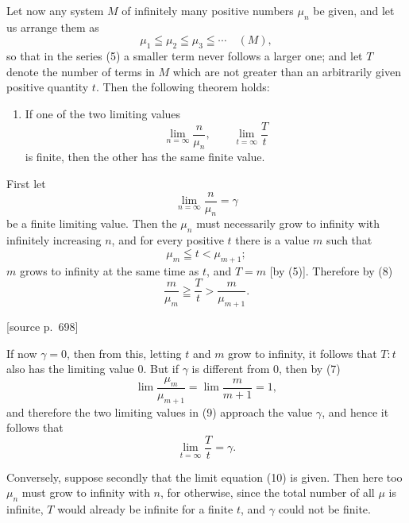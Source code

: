 \documentclass[11pt]{article}
\newcommand{\srcpage}[1]{\par\medskip\noindent\textsf{[source p.~#1]}\par\smallskip}
\begin{document}
Let now any system $M$ of infinitely many positive numbers $\mu_n$ be given, and let us arrange them as
\begin{equation}
\mu_1\leqq\mu_2\leqq\mu_3\leqq\cdots\quad (M),
\tag{5}
\end{equation}
so that in the series (5) a smaller term never follows a larger one; and let $T$ denote the number of terms in $M$ which are not greater than an arbitrarily given positive quantity $t$. Then the following theorem holds:

\begin{enumerate}[label=\textbf{\arabic*.},leftmargin=2.2em,start=4]
\item If one of the two limiting values
\begin{equation}
\lim_{n=\infty}\frac{n}{\mu_n},\qquad \lim_{t=\infty}\frac{T}{t}
\tag{6}
\end{equation}
is finite, then the other has the same finite value.
\end{enumerate}

First let
\begin{equation}
\lim_{n=\infty}\frac{n}{\mu_n}=\gamma
\tag{7}
\end{equation}
be a finite limiting value. Then the $\mu_n$ must necessarily grow to infinity with infinitely increasing $n$, and for every positive $t$ there is a value $m$ such that
\begin{equation}
\mu_m\leqq t<\mu_{m+1};
\tag{8}
\end{equation}
$m$ grows to infinity at the same time as $t$, and $T=m$ [by (5)]. Therefore by (8)
\begin{equation}
\frac{m}{\mu_m}\geqq\frac{T}{t}>\frac{m}{\mu_{m+1}} .
\tag{9}
\end{equation}

\srcpage{698}
If now $\gamma=0$, then from this, letting $t$ and $m$ grow to infinity, it follows that $T:t$ also has the limiting value $0$. But if $\gamma$ is different from $0$, then by (7)
\[
\lim\frac{\mu_m}{\mu_{m+1}}=\lim\frac{m}{m+1}=1,
\]
and therefore the two limiting values in (9) approach the value $\gamma$, and hence it follows that
\begin{equation}
\lim_{t=\infty}\frac{T}{t}=\gamma.
\tag{10}
\end{equation}

Conversely, suppose secondly that the limit equation (10) is given. Then here too $\mu_n$ must grow to infinity with $n$, for otherwise, since the total number of all $\mu$ is infinite, $T$ would already be infinite for a finite $t$, and $\gamma$ could not be finite.
\end{document}
